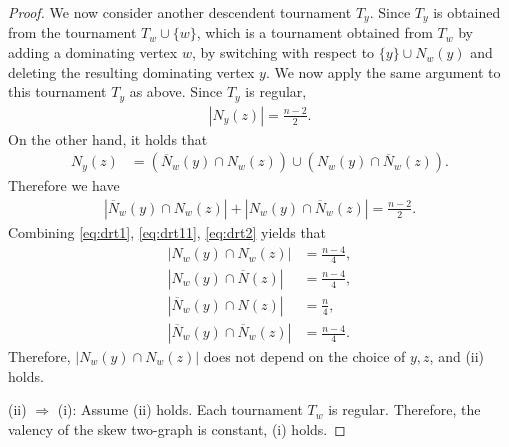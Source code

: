 \documentclass[10pt,a4paper]{amsart}
\begin{document}
\begin{proof}
    We now consider another descendent tournament $T_y$. Since $T_y$ is obtained from the tournament $T_w \cup\{w\}$, which is a tournament obtained from $T_w$ by adding a dominating vertex $w$, by switching with respect to $\{y\}\cup N_w(y)$ and deleting the resulting dominating vertex $y$.  
    We now apply the same argument to this tournament $T_y$ as above. 
    Since $T_y$ is regular, 
    \begin{align*}
        |N_y(z)|=\frac{n-2}{2}.     
    \end{align*}
    On the other hand, it holds that 
    \begin{align*}
        N_y(z)&=(\overline{N}_w(y)\cap N_w(z))\cup(N_w(y)\cap \overline{N}_w(z)).  
    \end{align*}
    Therefore we have 
    \begin{align}\label{eq:drt2}
        |\overline{N}_w(y)\cap N_w(z)|+|N_w(y)\cap \overline{N}_w(z)|=\frac{n-2}{2}.  
    \end{align}
    Combining \eqref{eq:drt1}, \eqref{eq:drt11}, \eqref{eq:drt2} yields that 
    \begin{align*}
        |N_w(y)\cap N_w(z)|&=\frac{n-4}{4},\\
        |N_w(y)\cap \overline{N}(z)|&=\frac{n-4}{4},\\
        |\overline{N}_w(y)\cap N(z)|&=\frac{n}{4},\\
        |\overline{N}_w(y)\cap \overline{N}_w(z)|&=\frac{n-4}{4}.
    \end{align*}
    Therefore, $|N_w(y)\cap N_w(z)|$ does not depend on the choice of $y,z$, and (ii) holds. 
    
    (ii) $\Rightarrow$ (i): 
    Assume (ii) holds. Each tournament $T_w$ is regular. Therefore, the valency of the skew two-graph is constant, (i) holds.   
\end{proof}
\end{document}
